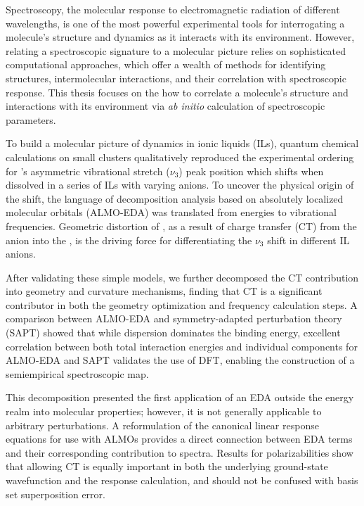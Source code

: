 \documentclass[%
  class = article,%
  crop = false,%
  float = true,%
  multi = true,%
  preview = false,%
]{standalone}
\newcommand{\arlidimer}{\ce{Ar\bond{....}Li+}}
\begin{document}
Spectroscopy, the molecular response to electromagnetic radiation of different wavelengths, is one of the most powerful experimental tools for interrogating a molecule's structure and dynamics as it interacts with its environment. However, relating a spectroscopic signature to a molecular picture relies on sophisticated computational approaches, which offer a wealth of methods for identifying structures, intermolecular interactions, and their correlation with spectroscopic response. This thesis focuses on the how to correlate a molecule's structure and interactions with its environment via \textit{ab initio} calculation of spectroscopic parameters.

To build a molecular picture of  dynamics in ionic liquids (ILs), quantum chemical calculations on small clusters qualitatively reproduced the experimental ordering for 's asymmetric vibrational stretch (\(\nu_3\)) peak position which shifts when dissolved in a series of ILs with varying anions. To uncover the physical origin of the shift, the language of decomposition analysis based on absolutely localized molecular orbitals (ALMO-EDA) was translated from energies to vibrational frequencies. Geometric distortion of , as a result of charge transfer (CT) from the anion into the , is the driving force for differentiating the  \(\nu_3\) shift in different IL anions.

After validating these simple models, we further decomposed the CT contribution into geometry and curvature mechanisms, finding that CT is a significant contributor in both the geometry optimization and frequency calculation steps. A comparison between ALMO-EDA and symmetry-adapted perturbation theory (SAPT) showed that while dispersion dominates the binding energy, excellent correlation between both total interaction energies and individual components for ALMO-EDA and SAPT validates the use of DFT, enabling the construction of a semiempirical spectroscopic map.

This decomposition presented the first application of an EDA outside the energy realm into molecular properties; however, it is not generally applicable to arbitrary perturbations. A reformulation of the canonical linear response equations for use with ALMOs provides a direct connection between EDA terms and their corresponding contribution to spectra. Results for \arlidimer{} polarizabilities show that allowing CT is equally important in both the underlying ground-state wavefunction and the response calculation, and should not be confused with basis set superposition error.
\end{document}
